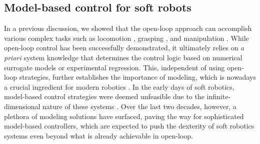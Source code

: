 \subsection{Model-based control for soft robots}
\label{sec:C0:modelbasedcontrol}
In a previous discussion, we showed that the open-loop approach can accomplish various complex tasks such as locomotion \cite{Suzumori1992,Choi2011,Katzschmann2018}, grasping \cite{Suzumori1992}, and manipulation \cite{Marchese2016}. While open-loop control has been successfully demonstrated, it ultimately relies on \textit{a priori} system knowledge that determines the control logic based on numerical surrogate models or experimental regression. This, independent of using open-loop strategies, further establishes the importance of modeling, which is nowadays a crucial ingredient for modern robotics \cite{Spong1996,Murray1994,Khatib1987}. %
In the early days of soft robotics, model-based control strategies were deemed unfeasible due to the infinite-dimensional nature of these systems \cite{DellaSantina2020}. Over the last two decades, however, a plethora of modeling solutions have surfaced, paving the way for sophisticated model-based controllers, which are expected to push the dexterity of soft robotics systems even beyond what is already achievable in open-loop.

